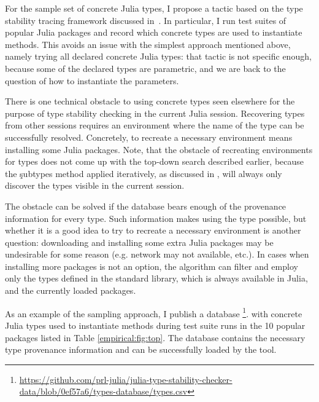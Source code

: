 For the sample set of concrete Julia types, I propose a tactic based on the type
stability tracing framework discussed in~. In
particular, I run test suites of popular Julia packages and record which
concrete types are used to instantiate methods.
This avoids an issue with the simplest approach mentioned above, namely trying
all declared concrete Julia types: that tactic is not specific enough,
because some of the declared types are parametric, and we are back to the
question of how to instantiate the parameters.

There is one technical obstacle to using concrete types seen elsewhere for the purpose
of type stability checking in the current Julia session. Recovering types from
other sessions requires an environment where the name of the type can be
successfully resolved. Concretely, to recreate a necessary environment means
installing some Julia packages.
Note, that the obstacle of recreating environments for types does not come up
with the top-down search described earlier, because the \c{subtypes} method
applied iteratively, as discussed in , will always only
discover the types visible in the current session.

The obstacle can be solved if the database bears enough
of the provenance information for every type. Such information makes using the
type possible, but whether it is a good idea to try to recreate a necessary
environment is another question: downloading and
installing some extra Julia packages may be undesirable for some reason (e.g.
network may not available, etc.). In cases when installing more packages is not
an option, the algorithm can filter and
employ only the types defined in the standard library, which is always available
in Julia, and the currently loaded packages.

As an example of the sampling approach, I publish a database
\footnote{%
  \url{https://github.com/prl-julia/julia-type-stability-checker-data/blob/0ef57a6/types-database/types.csv}}.
with concrete Julia types used to instantiate methods during test suite runs in
the 10 popular packages listed in Table \ref{empirical:fig:top}. The database
contains the necessary type provenance information and can be successfully
loaded by the tool.

